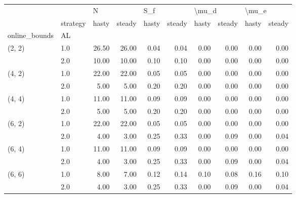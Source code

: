 \begin{tabular}{llrrrrrrrr}
\toprule
       & {} & \multicolumn{2}{l}{N} & \multicolumn{2}{l}{S\_f} & \multicolumn{2}{l}{\textbackslash mu\_d} & \multicolumn{2}{l}{\textbackslash mu\_e} \\
       & strategy & hasty & steady & hasty & steady & hasty & steady & hasty & steady \\
online\_bounds & AL &       &        &       &        &       &        &       &        \\
\midrule
(2, 2) & 1.0 & 26.50 &  26.00 &  0.04 &   0.04 &  0.00 &   0.00 &  0.00 &   0.00 \\
       & 2.0 & 10.00 &  10.00 &  0.10 &   0.10 &  0.00 &   0.00 &  0.00 &   0.00 \\
(4, 2) & 1.0 & 22.00 &  22.00 &  0.05 &   0.05 &  0.00 &   0.00 &  0.00 &   0.00 \\
       & 2.0 &  5.00 &   5.00 &  0.20 &   0.20 &  0.00 &   0.00 &  0.00 &   0.00 \\
(4, 4) & 1.0 & 11.00 &  11.00 &  0.09 &   0.09 &  0.00 &   0.00 &  0.00 &   0.00 \\
       & 2.0 &  5.00 &   5.00 &  0.20 &   0.20 &  0.00 &   0.00 &  0.00 &   0.00 \\
(6, 2) & 1.0 & 22.00 &  22.00 &  0.05 &   0.05 &  0.00 &   0.00 &  0.00 &   0.00 \\
       & 2.0 &  4.00 &   3.00 &  0.25 &   0.33 &  0.00 &   0.09 &  0.00 &   0.04 \\
(6, 4) & 1.0 & 11.00 &  11.00 &  0.09 &   0.09 &  0.00 &   0.00 &  0.00 &   0.00 \\
       & 2.0 &  4.00 &   3.00 &  0.25 &   0.33 &  0.00 &   0.09 &  0.00 &   0.04 \\
(6, 6) & 1.0 &  8.00 &   7.00 &  0.12 &   0.14 &  0.10 &   0.08 &  0.16 &   0.10 \\
       & 2.0 &  4.00 &   3.00 &  0.25 &   0.33 &  0.00 &   0.09 &  0.00 &   0.04 \\
\bottomrule
\end{tabular}
